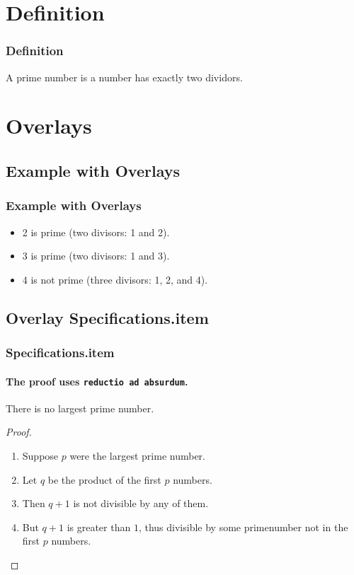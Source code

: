 \documentclass{beamer}
\begin{document}
\section{Definition}
\begin{frame}
  \frametitle{Definition}
  \begin{definition}
    A \alert{prime number} is a number has exactly two dividors.
  \end{definition}
\end{frame}

\section{Overlays}
\subsection{Example with Overlays}
\begin{frame}
  \frametitle{Example with Overlays}
  \begin{example}
    \begin{itemize}
    \item 2 is prime (two divisors: 1 and 2).
    \item 3 is prime (two divisors: 1 and 3).
      \pause
    \item 4 is not prime (\alert{three} divisors: 1, 2, and 4).
    \end{itemize}
  \end{example}
\end{frame}

\subsection{Overlay Specifications.item}
\begin{frame}[t]
  \frametitle{Specifications.item}
  \framesubtitle{The proof uses \texttt{reductio ad absurdum}.}

  \begin{theorem}There is no largest prime number.
  \end{theorem}
  \begin{proof}
    \begin{enumerate}
    \item<1-> Suppose $p$ were the largest prime number.
    \item<2-> Let $q$ be the product of the first $p$ numbers.
    \item<3-> Then $q + 1$ is not divisible by any of them.
    \item<1-> But $q + 1$ is greater than $1$, thus divisible by some
      primenumber not in the first $p$ numbers.\qedhere
    \end{enumerate}
  \end{proof}
\end{frame}
\end{document}
